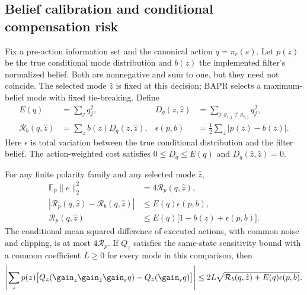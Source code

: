 \subsection{Belief calibration and conditional compensation risk}
\label{app:belief_risk}

Fix a pre-action information set and the canonical action $q=\pi_r(s)$.
Let $p(z)$ be the true conditional mode distribution and $b(z)$ the implemented filter's normalized belief.
Both are nonnegative and sum to one, but they need not coincide.
The selected mode $\hat z$ is fixed at this decision; BAPR selects a maximum-belief mode with fixed tie-breaking.
Define
\begin{align}
 E(q)&=\sum_j q_j^2, &
 D_q(z,\hat z)&=\sum_{j:g_{z,j}\ne g_{\hat z,j}}q_j^2,\\
 \mathcal R_b(q,\hat z)&=\sum_z b(z)D_q(z,\hat z), &
 \epsilon(p,b)&=\tfrac12\sum_z|p(z)-b(z)|.
\end{align}
Here $\epsilon$ is total variation between the true conditional distribution and the filter belief.
The action-weighted cost satisfies $0\le D_q\le E(q)$ and $D_q(\hat z,\hat z)=0$.

\begin{proposition}
\label{prop:belief_risk}
For any finite polarity family and any selected mode $\hat z$,
\begin{align}
 \mathbb E_p\|e\|_2^2&=4\mathcal R_p(q,\hat z),\label{eq:belief_squared_error}\\
 |\mathcal R_p(q,\hat z)-\mathcal R_b(q,\hat z)|
 &\le E(q)\epsilon(p,b),\label{eq:belief_calibration}\\
 \mathcal R_p(q,\hat z)&\le E(q)\bigl[1-b(\hat z)+\epsilon(p,b)\bigr].
 \label{eq:belief_confidence}
\end{align}
The conditional mean squared difference of executed actions, with common noise and clipping, is at most $4\mathcal R_p$.
If $Q_z$ satisfies the same-state sensitivity bound with a common coefficient $L\ge0$ for every mode in this comparison, then
\begin{equation}
 \left|\sum_z p(z)\bigl[Q_z(\gain_z\gain_{\hat z}\gain_rq)
               -Q_z(\gain_rq)\bigr]\right|
 \le 2L\sqrt{\mathcal R_b(q,\hat z)+E(q)\epsilon(p,b)}.
 \label{eq:belief_value_bound}
\end{equation}
\end{proposition}

